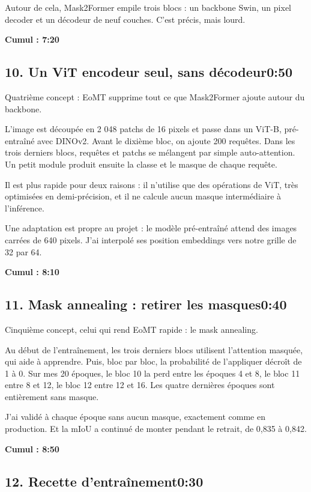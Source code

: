 \documentclass[11pt,a4paper]{article}
\newcommand{\cumul}[1]{\par{\hfill\small\color{accent}\bfseries #1}\par}
\newcommand{\tempo}[1]{\hfill{\normalsize\color{accent}#1}}
\begin{document}
Autour de cela, Mask2Former empile trois blocs : un backbone Swin, un pixel decoder et un décodeur de neuf couches. C'est précis, mais lourd.

\cumul{Cumul : 7:20}

\subsection*{10. Un ViT encodeur seul, sans décodeur\tempo{0:50}}

Quatrième concept : EoMT supprime tout ce que Mask2Former ajoute autour du backbone.

L'image est découpée en 2 048 patchs de 16 pixels et passe dans un ViT-B, pré-entraîné avec DINOv2. Avant le dixième bloc, on ajoute 200 requêtes. Dans les trois derniers blocs, requêtes et patchs se mélangent par simple auto-attention. Un petit module produit ensuite la classe et le masque de chaque requête.

Il est plus rapide pour deux raisons : il n'utilise que des opérations de ViT, très optimisées en demi-précision, et il ne calcule aucun masque intermédiaire à l'inférence.

Une adaptation est propre au projet : le modèle pré-entraîné attend des images carrées de 640 pixels. J'ai interpolé ses position embeddings vers notre grille de 32 par 64.

\cumul{Cumul : 8:10}

\subsection*{11. Mask annealing : retirer les masques\tempo{0:40}}

Cinquième concept, celui qui rend EoMT rapide : le mask annealing.

Au début de l'entraînement, les trois derniers blocs utilisent l'attention masquée, qui aide à apprendre. Puis, bloc par bloc, la probabilité de l'appliquer décroît de 1 à 0. Sur mes 20 époques, le bloc 10 la perd entre les époques 4 et 8, le bloc 11 entre 8 et 12, le bloc 12 entre 12 et 16. Les quatre dernières époques sont entièrement sans masque.

J'ai validé à chaque époque sans aucun masque, exactement comme en production. Et la mIoU a continué de monter pendant le retrait, de 0,835 à 0,842.

\cumul{Cumul : 8:50}

\subsection*{12. Recette d'entraînement\tempo{0:30}}
\end{document}

